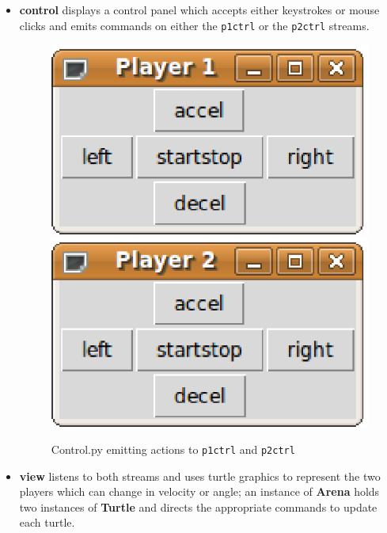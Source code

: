 \documentclass[12pt,a4,notitlepage]{report}
\renewcommand{\_}{\texttt{\symbol{95}}}
\newcommand{\<}{\texttt{\symbol{60}}}
\renewcommand{\>}{\texttt{\symbol{62}}}
\newcommand{\class}[1]{\textbf{#1}}
\newcommand{\scopendpoint}[1]{\texttt{#1}}
\begin{document}
\begin{itemize}
\item \class{control} displays a control panel which accepts either keystrokes or mouse clicks and emits commands on either the \scopendpoint{p1ctrl} or the \scopendpoint{p2ctrl} streams.

\begin{figure}[hb]
\centering
\includegraphics[scale=0.5,angle=0]{images/ControlP1.ps}
\includegraphics[scale=0.5,angle=0]{images/ControlP2.ps}
\caption{Control.py emitting actions to \scopendpoint{p1ctrl} and \scopendpoint{p2ctrl}}
\label{control}
\end{figure}

\item \class{view} listens to both streams and uses turtle graphics to represent the two players which can change in velocity or angle; an instance of \class{Arena} holds two instances of \class{Turtle} and directs the appropriate commands to update each turtle.


\end{itemize}
\end{document}
